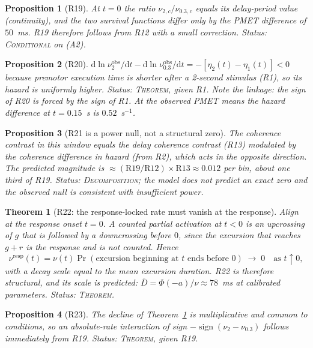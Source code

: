 \documentclass[11pt,a4paper]{article}
\newcommand{\dd}{\mathrm{d}}
\theoremstyle{plain}
\newtheorem{proposition}{Proposition}
\newtheorem{theorem}{Theorem}
\theoremstyle{remark}
\begin{document}
\begin{proposition}[R19]
At $t=0$ the ratio $\nu_{2,c}/\nu_{0.3,c}$ equals its delay-period value (continuity), and
the two survival functions differ only by the PMET difference of $50$~ms. R19 therefore
follows from R12 with a small correction. \emph{Status: \textsc{Conditional} on (A2).}
\end{proposition}

\begin{proposition}[R20]
$\dd\ln\nu^{\text{obs}}_{2}/\dd t-\dd\ln\nu^{\text{obs}}_{0.3}/\dd t=-[\eta_2(t)-\eta_1(t)]<0$
because premotor execution time is shorter after a 2-second stimulus (R1), so its hazard is
uniformly higher. \emph{Status: \textsc{Theorem}, given R1.} Note the linkage: the sign of
R20 is forced by the sign of R1. At the observed PMET means the hazard difference at
$t=0.15$~s is $0.52$~s$^{-1}$.
\end{proposition}

\begin{proposition}[R21 is a power null, not a structural zero]
The coherence contrast in this window equals the delay coherence contrast (R13) modulated
by the coherence difference in hazard (from R2), which acts in the opposite direction. The
predicted magnitude is $\approx(\text{R19}/\text{R12})\times\text{R13}\approx0.012$ per
bin, about one third of R19. \emph{Status: \textsc{Decomposition}; the model does not
predict an exact zero and the observed null is consistent with insufficient power.}
\end{proposition}

\begin{theorem}[R22: the response-locked rate must vanish at the response]
\label{thm:R22}
Align at the response onset $t=0$. A counted partial activation at $t<0$ is an upcrossing
of $g$ that is followed by a downcrossing before $0$, since the excursion that reaches
$g+r$ is the response and is not counted. Hence
\begin{equation}
\nu^{\text{resp}}(t)=\nu(t)\Pr(\text{excursion beginning at }t\text{ ends before }0)
\;\longrightarrow\;0\quad\text{as }t\uparrow0,
\end{equation}
with a decay scale equal to the mean excursion duration. R22 is therefore structural, and
its \emph{scale} is predicted: $\bar D=\Phi(-a)/\nu\approx78$~ms at calibrated parameters.
\emph{Status: \textsc{Theorem}.}
\end{theorem}

\begin{proposition}[R23]
The decline of Theorem~\ref{thm:R22} is multiplicative and common to conditions, so an
absolute-rate interaction of sign $-\operatorname{sign}(\nu_2-\nu_{0.3})$ follows
immediately from R19. \emph{Status: \textsc{Theorem}, given R19.}
\end{proposition}
\end{document}
